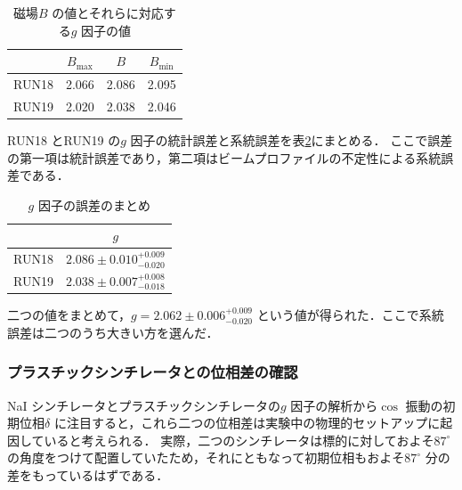 \begin{table}[H]
\caption{磁場$B$ の値とそれらに対応する$g$ 因子の値}
\centering
\begin{tabular}{cccc}\toprule%
{} & $B_\mathrm{max}$ & $B$ & $B_\mathrm{min}$  \\ \midrule
RUN18 & 2.066 & 2.086 & 2.095 \\
RUN19 & 2.020 & 2.038 & 2.046 \\ \bottomrule
\end{tabular}
\label{tab:mag_g}
\end{table}

RUN18 とRUN19 の$g$ 因子の統計誤差と系統誤差を表\ref{tab:NaIggosamatome}にまとめる．
ここで誤差の第一項は統計誤差であり，第二項はビームプロファイルの不定性による系統誤差である．

\begin{table}[H]%
\caption{$g$ 因子の誤差のまとめ}
\centering
\begingroup
\renewcommand{\arraystretch}{1.2}%
\begin{tabular}{cc}\toprule
{} &   $g$  \\ \midrule
RUN18 & $2.086 \pm 0.010^{+0.009}_{-0.020} $  \\
RUN19 & $2.038 \pm 0.007^{+0.008}_{-0.018} $  \\ \bottomrule
\end{tabular}\label{tab:NaIggosamatome}
\endgroup
\end{table}

二つの値をまとめて，$g = 2.062 \pm 0.006^{+0.009}_{-0.020}$ という値が得られた．ここで系統誤差は二つのうち大きい方を選んだ．

\subsubsection{プラスチックシンチレータとの位相差の確認}
\label{subsubsec:PhaseCheck}

NaI シンチレータとプラスチックシンチレータの$g$ 因子の解析から$\cos$ 振動の初期位相$\delta$ に注目すると，これら二つの位相差は実験中の物理的セットアップに起因していると考えられる．
実際，二つのシンチレータは標的に対しておよそ$87^{\circ}$ の角度をつけて配置していたため，それにともなって初期位相もおよそ$87^{\circ}$ 分の差をもっているはずである．

